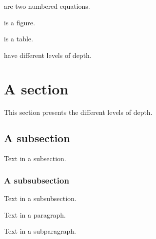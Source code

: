  are two numbered equations.

 is a figure.

 is a table.

 have different levels of depth.

\section{A section}
\label{sec:a-section}

This section presents the different levels of depth.

\subsection{A subsection}
\label{ssec:a-subsection}

Text in a subsection.

\subsubsection{A subsubsection}

Text in a subsubsection.


Text in a paragraph.


Text in a subparagraph.
